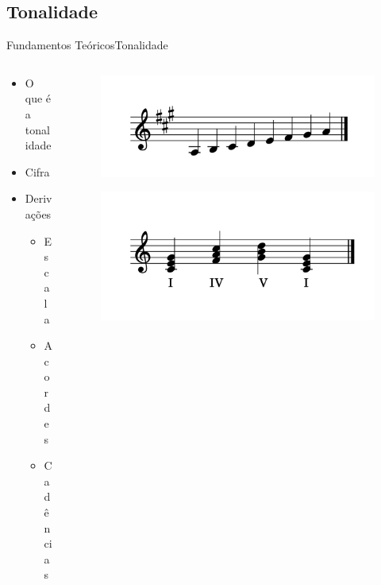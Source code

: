 \subsection{Tonalidade}
\begin{frame}{Fundamentos Teóricos}{Tonalidade}
    \begin{columns}[]
        \begin{column}{.4\textwidth}
            \begin{itemize}
            \item O que é a tonalidade
            \item Cifra
            \item Derivações
            \begin{itemize}
                \item Escala
                \item Acordes
                \item Cadências
            \end{itemize}
            \end{itemize}
        \end{column}
        \begin{column}{.6\textwidth}
            \begin{figure}
                \includegraphics[width=.9\textwidth]{figs/escala.png}
            \end{figure}
            \vspace{-1cm}
            \begin{figure}
                \includegraphics[width=.9\textwidth]{figs/acorde.png}
            \end{figure}
        \end{column}
    \end{columns}
\end{frame}

